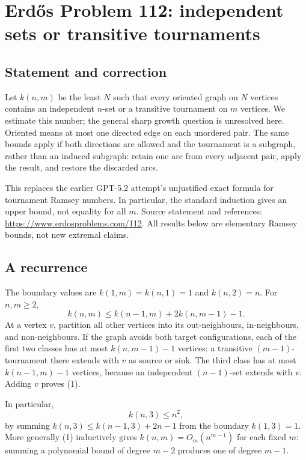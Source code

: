 \section*{Erd\H{o}s Problem 112: independent sets or transitive tournaments}
\subsection*{Statement and correction}
Let $k(n,m)$ be the least $N$ such that every oriented graph on $N$ vertices contains an independent $n$-set or a transitive tournament on $m$ vertices. We estimate this number; the general sharp growth question is unresolved here. Oriented means at most one directed edge on each unordered pair. The same bounds apply if both directions are allowed and the tournament is a subgraph, rather than an induced subgraph: retain one arc from every adjacent pair, apply the result, and restore the discarded arcs.

This replaces the earlier GPT-5.2 attempt's unjustified exact formula for tournament Ramsey numbers. In particular, the standard induction gives an upper bound, not equality for all $m$. Source statement and references: \url{https://www.erdosproblems.com/112}. All results below are elementary Ramsey bounds, not new extremal claims.

\subsection*{A recurrence}
The boundary values are $k(1,m)=k(n,1)=1$ and $k(n,2)=n$. For $n,m\ge2$,
\[
 k(n,m)\le k(n-1,m)+2k(n,m-1)-1. \tag{1}
\]
At a vertex $v$, partition all other vertices into its out-neighbours, in-neighbours, and non-neighbours. If the graph avoids both target configurations, each of the first two classes has at most $k(n,m-1)-1$ vertices: a transitive $(m-1)$-tournament there extends with $v$ as source or sink. The third class has at most $k(n-1,m)-1$ vertices, because an independent $(n-1)$-set extends with $v$. Adding $v$ proves (1).

In particular,
\[
 k(n,3)\le n^2,
\]
by summing $k(n,3)\le k(n-1,3)+2n-1$ from the boundary $k(1,3)=1$. More generally (1) inductively gives $k(n,m)=O_m(n^{m-1})$ for each fixed $m$: summing a polynomial bound of degree $m-2$ produces one of degree $m-1$.

